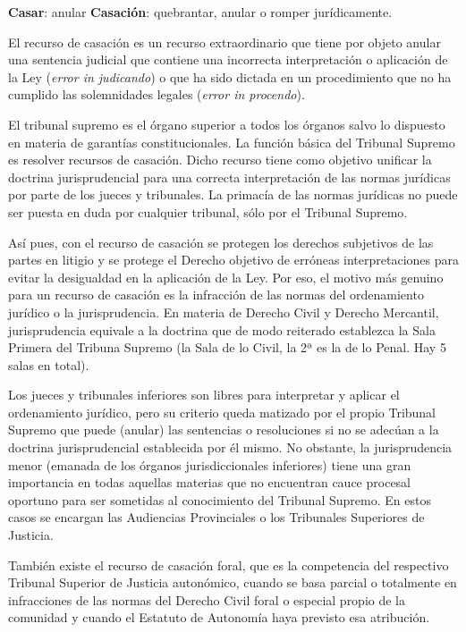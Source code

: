 \documentclass[a4paper,12pt]{report}
\begin{document}
\textbf{Casar}: anular
\textbf{Casación}: quebrantar, anular o romper jurídicamente.

El recurso de casación es un recurso extraordinario que tiene por objeto anular una sentencia judicial que contiene una incorrecta interpretación o aplicación de la Ley (\textit{error in judicando}) o que ha sido dictada en un procedimiento que no ha cumplido las solemnidades legales (\textit{error in procendo}).

El tribunal supremo es el órgano superior a todos los órganos salvo lo dispuesto en materia de garantías constitucionales. La función básica del Tribunal Supremo es resolver recursos de casación. Dicho recurso tiene como objetivo unificar la doctrina jurisprudencial para una correcta interpretación de las normas jurídicas por parte de los jueces y tribunales. La primacía de las normas jurídicas no puede ser puesta en duda por cualquier tribunal, sólo por el Tribunal Supremo.

Así pues, con el recurso de casación se protegen los derechos subjetivos de las partes en litigio y se protege el Derecho objetivo de erróneas interpretaciones para evitar la desigualdad en la aplicación de la Ley. Por eso, el motivo más genuino para un recurso de casación es la infracción de las normas del ordenamiento jurídico o la jurisprudencia. En materia de Derecho Civil y Derecho Mercantil, jurisprudencia equivale a la doctrina que de modo reiterado establezca la Sala Primera del Tribuna Supremo (la Sala de lo Civil, la 2ª  es la de lo Penal. Hay 5 salas en total).

Los jueces y tribunales inferiores son libres para interpretar y aplicar el ordenamiento jurídico, pero su criterio queda matizado por el propio Tribunal Supremo que puede  (anular) las sentencias o resoluciones si no se adecúan a la doctrina jurisprudencial establecida por él mismo. No obstante, la jurisprudencia menor (emanada de los órganos jurisdiccionales inferiores) tiene una gran importancia en todas aquellas materias que no encuentran cauce procesal oportuno para ser sometidas al conocimiento del Tribunal Supremo. En estos casos se encargan las Audiencias Provinciales o los Tribunales Superiores de Justicia.

También existe el recurso de casación foral, que es la competencia del respectivo Tribunal Superior de Justicia autonómico, cuando se basa parcial o totalmente en infracciones de las normas del Derecho Civil foral o especial propio de la comunidad y cuando el Estatuto de Autonomía haya previsto esa atribución.
\end{document}
